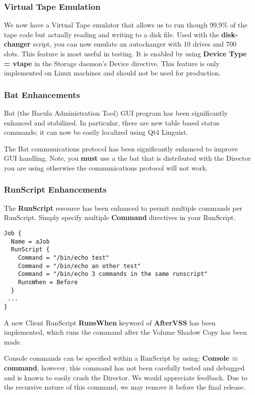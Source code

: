 \subsubsection{Virtual Tape Emulation}
We now have a Virtual Tape emulator that allows us to run though 99.9\% of
the tape code but actually reading and writing to a disk file. Used with the
\textbf{disk-changer} script, you can now emulate an autochanger with 10 drives
and 700 slots. This feature is most useful in testing.  It is enabled
by using {\bf Device Type = vtape} in the Storage daemon's Device
directive. This feature is only implemented on Linux machines and should not be
used for production.

\subsubsection{Bat Enhancements}
Bat (the Bacula Administration Tool) GUI program has been significantly
enhanced and stabilized. In particular, there are new table based status 
commands; it can now be easily localized using Qt4 Linguist.

The Bat communications protocol has been significantly enhanced to improve
GUI handling. Note, you {\bf must} use a the bat that is distributed with
the Director you are using otherwise the communications protocol will not
work.

\subsubsection{RunScript Enhancements}
The {\bf RunScript} resource has been enhanced to permit multiple
commands per RunScript.  Simply specify multiple {\bf Command} directives
in your RunScript.

\begin{verbatim}
Job {
  Name = aJob
  RunScript {
    Command = "/bin/echo test"
    Command = "/bin/echo an other test"
    Command = "/bin/echo 3 commands in the same runscript"
    RunsWhen = Before
  }
 ...
}
\end{verbatim}

A new Client RunScript {\bf RunsWhen} keyword of {\bf AfterVSS} has been
implemented, which runs the command after the Volume Shadow Copy has been made.

Console commands can be specified within a RunScript by using:
{\bf Console = \lt{}command\gt{}}, however, this command has not been 
carefully tested and debugged and is known to easily crash the Director.
We would appreciate feedback.  Due to the recursive nature of this command, we
may remove it before the final release.

